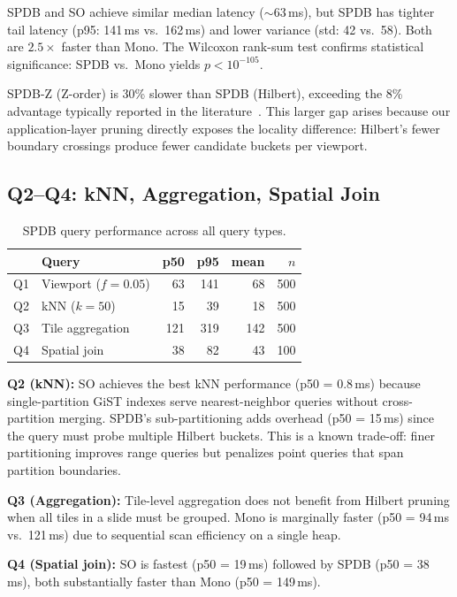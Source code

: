 \documentclass[sigconf]{acmart}
\begin{document}
SPDB and SO achieve similar median latency ($\sim$63\,ms), but SPDB has tighter tail latency (p95: 141\,ms vs.\ 162\,ms) and lower variance (std: 42 vs.\ 58).
Both are $2.5\times$ faster than Mono.
The Wilcoxon rank-sum test confirms statistical significance: SPDB vs.\ Mono yields $p < 10^{-105}$.

SPDB-Z (Z-order) is 30\% slower than SPDB (Hilbert), exceeding the 8\% advantage typically reported in the literature~\cite{kamel1994hilbert,moon2001analysis}.
This larger gap arises because our application-layer pruning directly exposes the locality difference: Hilbert's fewer boundary crossings produce fewer candidate buckets per viewport.

\subsection{Q2--Q4: kNN, Aggregation, Spatial Join}

\begin{table}[t]
\centering
\caption{SPDB query performance across all query types.}
\label{tab:allqueries}
\scriptsize
\begin{tabular}{@{}llrrrr@{}}
\toprule
& \textbf{Query} & \textbf{p50} & \textbf{p95} & \textbf{mean} & \textbf{$n$} \\
\midrule
Q1 & Viewport ($f{=}0.05$) & 63 & 141 & 68 & 500 \\
Q2 & kNN ($k{=}50$) & 15 & 39 & 18 & 500 \\
Q3 & Tile aggregation & 121 & 319 & 142 & 500 \\
Q4 & Spatial join & 38 & 82 & 43 & 100 \\
\bottomrule
\end{tabular}
\end{table}

\textbf{Q2 (kNN):}
SO achieves the best kNN performance (p50 = 0.8\,ms) because single-partition GiST indexes serve nearest-neighbor queries without cross-partition merging.
SPDB's sub-partitioning adds overhead (p50 = 15\,ms) since the query must probe multiple Hilbert buckets.
This is a known trade-off: finer partitioning improves range queries but penalizes point queries that span partition boundaries.

\textbf{Q3 (Aggregation):}
Tile-level aggregation does not benefit from Hilbert pruning when all tiles in a slide must be grouped.
Mono is marginally faster (p50 = 94\,ms vs.\ 121\,ms) due to sequential scan efficiency on a single heap.

\textbf{Q4 (Spatial join):}
SO is fastest (p50 = 19\,ms) followed by SPDB (p50 = 38\,ms), both substantially faster than Mono (p50 = 149\,ms).
\end{document}

